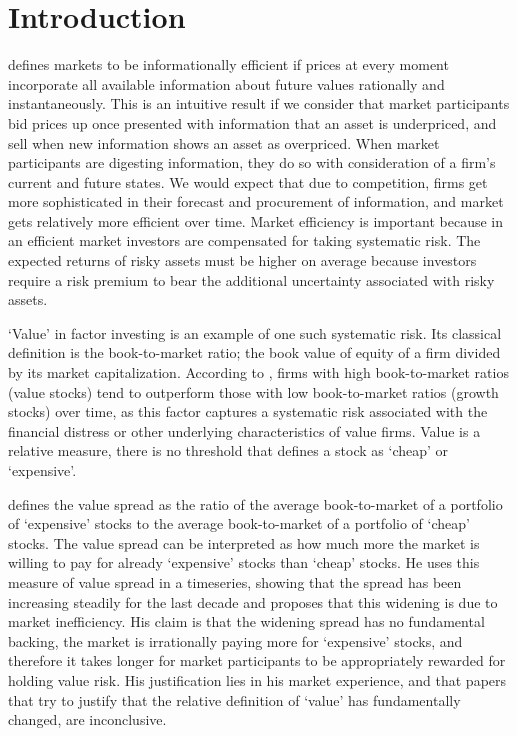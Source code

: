 \section{Introduction}
\indent \citet{fama_EMH} defines markets to be informationally efficient if prices at
 every moment incorporate all available information about future values rationally and instantaneously.
 This is an intuitive result if we consider that market participants bid prices up once presented with information that
 an asset is underpriced, and sell when new information shows an asset as overpriced. When market participants are digesting information,
 they do so with consideration of a firm's current and future states. We would expect that due to competition,
 firms get more sophisticated in their forecast and procurement of information, and market gets relatively more
 efficient over time. Market efficiency is important because in an efficient market investors are compensated for
taking systematic risk. The expected returns of risky assets must be higher on average because investors 
require a risk premium to bear the additional uncertainty associated with risky assets.

`Value' in factor investing is an example of one such systematic risk. Its classical definition is the book-to-market ratio; the book value of equity of a firm divided by its market capitalization.
According to \citet{fama_french_1993}, firms with high book-to-market ratios (value stocks) tend to outperform those with low book-to-market ratios (growth stocks) over time, 
as this factor captures a systematic risk associated with the financial distress or other underlying characteristics of value firms.
Value is a relative measure, there is no threshold that defines a stock as `cheap' or `expensive'. 

\citet{asness_2024} defines the value spread as the ratio of the average book-to-market of a portfolio of `expensive' stocks to the average book-to-market of
a portfolio of `cheap' stocks. The value spread can be interpreted as how much more the market is willing to pay for 
already `expensive' stocks than `cheap' stocks. He uses this measure of value spread in a timeseries, showing that the spread has been increasing steadily for the last decade
and proposes that this widening is due to market inefficiency. His claim is that the widening spread has no fundamental backing, the market is irrationally paying
more for `expensive' stocks, and therefore it takes longer for market participants to be appropriately rewarded for holding value risk.
His justification lies in his market experience, and that papers that try to justify that the relative definition of `value' has fundamentally changed, are inconclusive.

